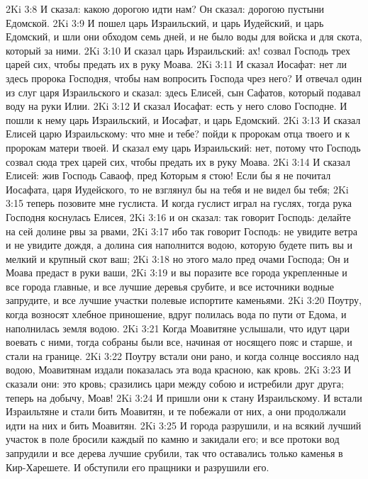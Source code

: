 \vs 2Ki 3:8 И сказал: какою дорогою идти нам? Он сказал: дорогою пустыни Едомской.
\vs 2Ki 3:9 И пошел царь Израильский, и царь Иудейский, и царь Едомский, и шли они обходом семь дней, и не было воды для войска и для скота, который  за ними.
\vs 2Ki 3:10 И сказал царь Израильский: ах! созвал Господь трех царей сих, чтобы предать их в руку Моава.
\vs 2Ki 3:11 И сказал Иосафат: нет ли здесь пророка Господня, чтобы нам вопросить Господа чрез него? И отвечал один из слуг царя Израильского и сказал: здесь Елисей, сын Сафатов, который подавал воду на руки Илии.
\vs 2Ki 3:12 И сказал Иосафат: есть у него слово Господне. И пошли к нему царь Израильский, и Иосафат, и царь Едомский.
\vs 2Ki 3:13 И сказал Елисей царю Израильскому: что мне и тебе? пойди к пророкам отца твоего и к пророкам матери твоей. И сказал ему царь Израильский: нет, потому что Господь созвал сюда трех царей сих, чтобы предать их в руку Моава.
\vs 2Ki 3:14 И сказал Елисей: жив Господь Саваоф, пред Которым я стою! Если бы я не почитал Иосафата, царя Иудейского, то не взглянул бы на тебя и не видел бы тебя;
\vs 2Ki 3:15 теперь позовите мне гуслиста. И когда гуслист играл на гуслях, тогда рука Господня коснулась Елисея,
\vs 2Ki 3:16 и он сказал: так говорит Господь: делайте на сей долине рвы за рвами,
\vs 2Ki 3:17 ибо так говорит Господь: не увидите ветра и не увидите дождя, а долина сия наполнится водою, которую будете пить вы и мелкий и крупный скот ваш;
\vs 2Ki 3:18 но этого мало пред очами Господа; Он и Моава предаст в руки ваши,
\vs 2Ki 3:19 и вы поразите все города укрепленные и все города главные, и все лучшие деревья срубите, и все источники водные запрудите, и все лучшие участки полевые испортите каменьями.
\vs 2Ki 3:20 Поутру, когда возносят хлебное приношение, вдруг полилась вода по пути от Едома, и наполнилась земля водою.
\rsbpar\vs 2Ki 3:21 Когда Моавитяне услышали, что идут цари воевать с ними, тогда собраны были все, начиная от носящего пояс и старше, и стали на границе.
\vs 2Ki 3:22 Поутру встали они рано, и когда солнце воссияло над водою, Моавитянам издали показалась эта вода красною, как кровь.
\vs 2Ki 3:23 И сказали они: это кровь; сразились цари между собою и истребили друг друга; теперь на добычу, Моав!
\vs 2Ki 3:24 И пришли они к стану Израильскому. И встали Израильтяне и стали бить Моавитян, и те побежали от них, а они продолжали идти на них и бить Моавитян.
\vs 2Ki 3:25 И города разрушили, и на всякий лучший участок в поле бросили каждый по камню и закидали его; и все протоки вод запрудили и все дерева лучшие срубили, так что оставались только каменья в Кир-Харешете. И обступили его пращники и разрушили его.
